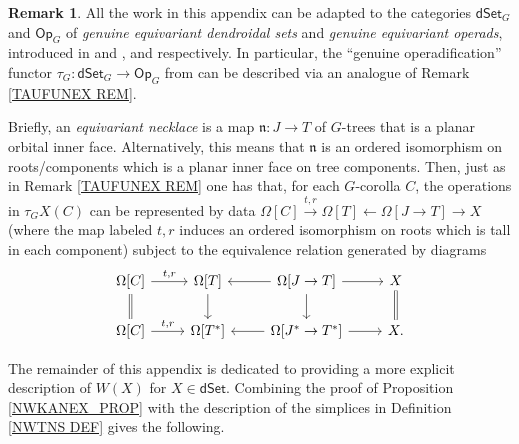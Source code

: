 \documentclass[a4paper,10pt
,draft
]{article}%
\numberwithin{equation}{section}
\numberwithin{figure}{section}
\theoremstyle{definition} %
\newtheorem{remark}[equation]{Remark}%
\newcommand{\1}{\ensuremath{\mathbbm 1}}%
\begin{document}
\begin{remark}\label{GTAUFUNEX REM}
	All the work in this appendix can be adapted to the categories
	$\mathsf{dSet}_G$ and $\mathsf{Op}_G$
	of \textit{genuine equivariant dendroidal sets} and \textit{genuine equivariant operads},
	introduced in \cite[\S 5.4]{Per18} and \cite[\S \ref{TAS-EDS_SEC}]{BP_TAS}, and \cite{BP_geo} respectively.
%	
	In particular, 
	the ``genuine operadification'' functor
	$\tau_G \colon \mathsf{dSet}_G \to \mathsf{Op}_G$
	from
	\cite[ \eqref{TAS-TAUFUNCTS EQ}]{BP_TAS}
	can be described via an analogue of
	Remark \ref{TAUFUNEX REM}.
	
Briefly,
an \emph{equivariant necklace}
is a map $\mathfrak{n} \colon J \to T$ of $G$-trees
that is a planar orbital inner face.
Alternatively, this means that $\mathfrak{n}$
is an ordered isomorphism on roots/components which is a planar inner face on tree components. 
%
Then, just as in Remark \ref{TAUFUNEX REM}
one has that, for each $G$-corolla $C$,
the operations in 
$\tau_G X(C)$
can be represented by data
$\Omega[C] \xrightarrow{t,r}
\Omega[T] \leftarrow
\Omega[J \to T] \to 
X$
(where the map labeled $t,r$ induces an ordered isomorphism on roots which is tall in each component)
subject to the equivalence relation generated by diagrams
\[
\begin{tikzcd}
\Omega[C] \ar{r}{t,r} \ar[equal]{d} &
\Omega[T] \ar{d} &
\Omega[J \to T] \ar{l} \ar{r} \ar{d} &
X \ar[equal]{d}
\\
\Omega[C] \ar{r}{t,r} &
\Omega[T^{\**}] &
\Omega[J^{\**} \to T^{\**}] \ar{l} \ar{r} &
X.
\end{tikzcd}
\]

\end{remark}




The remainder of this appendix is dedicated to providing a more explicit description of $W(X)$ for $X \in \mathsf{dSet}$.
%
Combining the proof of Proposition \ref{NWKANEX_PROP}
with the description of the simplices 
in Definition \ref{NWTNS DEF} gives the following.
\end{document}
